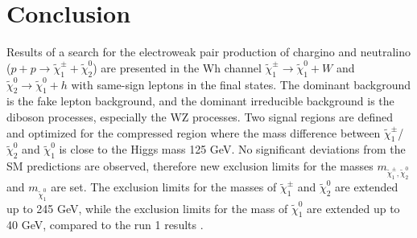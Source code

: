 \chapter{Conclusion}
\label{ch:conclusion}

Results of a search for the electroweak pair production of chargino and neutralino
($p + p \rightarrow \tilde{\chi}_1^\pm + \tilde{\chi}_2^0$) are presented in the Wh channel $\tilde{\chi}_1^\pm \rightarrow \tilde{\chi}_1^0 + W$ and $\tilde{\chi}_2^0 \rightarrow \tilde{\chi}_1^0 + h$ with same-sign leptons in the final states.
The dominant background is the fake lepton background, and the dominant irreducible background is the diboson processes, especially the WZ processes.
Two signal regions are defined and optimized for the compressed region where the mass difference between $\tilde{\chi}_1^\pm$/$\tilde{\chi}_2^0$ and $\tilde{\chi}_1^0$ is close to the Higgs mass 125 GeV.
No significant deviations from the SM predictions are observed, therefore new exclusion limits for the masses $m_{\tilde{\chi}_1^\pm, \tilde{\chi}_2^0}$ and $m_{\tilde{\chi}_1^0}$ are set.
The exclusion limits for the masses of $\tilde{\chi}_1^\pm$ and $\tilde{\chi}_2^0$ are extended up to 245 GeV, while the exclusion limits for the mass of $\tilde{\chi}_1^0$ are extended up to 40 GeV, compared to the run 1 results \cite{run1}.
